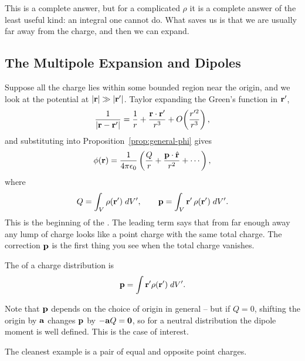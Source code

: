 \documentclass[a4paper]{scrartcl}
\newcommand{\hh}[1]{\hat{\vv{#1}}}
\begin{document}
This is a complete answer, but for a complicated $\rho$ it is a complete answer of the least useful kind: an integral one cannot do. What saves us is that we are usually far away from the charge, and then we can expand.

\subsection{The Multipole Expansion and Dipoles}

Suppose all the charge lies within some bounded region near the origin, and we look at the potential at $|\mathbf{r}| \gg |\mathbf{r}'|$. Taylor expanding the Green's function in $\mathbf{r}'$,
$$
\frac{1}{|\mathbf{r}-\mathbf{r}'|} = \frac{1}{r} + \frac{\mathbf{r}\cdot \mathbf{r}'}{r^3} + O\!\left(\frac{r'^2}{r^3}\right),
$$
and substituting into Proposition~\ref{prop:general-phi} gives
$$
\phi(\vv{r}) = \frac{1}{4\pi \epsilon_0}\left(\frac{Q}{r} + \frac{\vv{p}\cdot \hh{r}}{r^2} + \cdots\right),
$$
where
$$
Q = \int_V \rho(\mathbf{r}')\; d V', \qquad \mathbf{p} = \int_V \mathbf{r}'\, \rho(\mathbf{r}')\; d V'.
$$
This is the beginning of the . The leading term says that from far enough away any lump of charge looks like a point charge with the same total charge. The correction $\mathbf{p}$ is the first thing you see when the total charge vanishes.

\begin{definition}
	The  of a charge distribution is
	$$
	\mathbf{p} = \int \mathbf{r}'\rho(\mathbf{r}')\; d V'.
	$$
\end{definition}

Note that $\mathbf{p}$ depends on the choice of origin in general -- but if $Q = 0$, shifting the origin by $\mathbf{a}$ changes $\mathbf{p}$ by $-\mathbf{a}Q = \mathbf{0}$, so for a neutral distribution the dipole moment is well defined. This is the case of interest.

The cleanest example is a pair of equal and opposite point charges.
\end{document}
